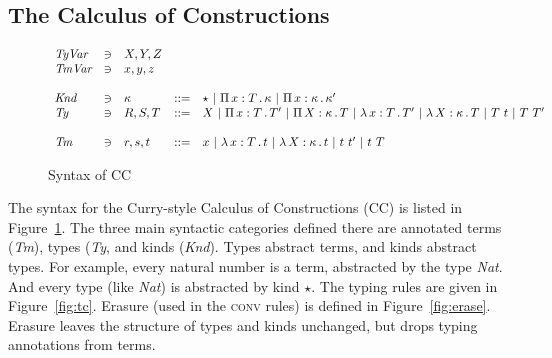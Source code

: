 \documentclass{article}
\begin{document}
\subsection{The Calculus of Constructions}

\begin{figure}
\[
\begin{array}{lllll}
  \textit{TyVar} & \ni & X,Y,Z & \ &\ \\
  \textit{TmVar} & \ni & x,y,z & \ &\ \\\\
  \textit{Knd} & \ni & \kappa & ::= & \star\ |\ \Pia{x}{T}{\kappa}\ |\ \Pia{x}{\kappa}{\kappa'} \\
  \textit{Ty} & \ni & R,S,T & ::= &
     X \ | \ \Pia{x}{T}{T'}\ |\ \Pia{X}{\kappa}{T}\ |\ \tlam{x}{T}{T'} \ |\ \tlam{X}{\kappa}{T}\ |\ T\ t\ |\ T\ T' \\\\
  \textit{Tm} & \ni & r,s,t & ::= & x \ |\ \tlam{x}{T}{t}\ | \ \tlam{X}{\kappa}{t}\ |\ t\ t'\ |\ t\ T \ 
\end{array}
\]
\caption{Syntax of CC}
\label{fig:ccsyn}
\end{figure}

The syntax for the Curry-style Calculus of Constructions (CC) is
listed in Figure~\ref{fig:ccsyn}.  The three main syntactic categories
defined there are annotated terms (\textit{Tm}), types (\textit{Ty},
and kinds (\textit{Knd}).  Types abstract terms, and kinds abstract
types.  For example, every natural number is a term, abstracted by the
type \textit{Nat}.  And every type (like \textit{Nat}) is abstracted
by kind $\star$.  The typing rules are given in Figure~\ref{fig:tc}.  Erasure (used in
the \textsc{conv} rules) is defined in Figure~\ref{fig:erase}.  Erasure
leaves the structure of types and kinds unchanged, but drops typing
annotations from terms.
\end{document}
